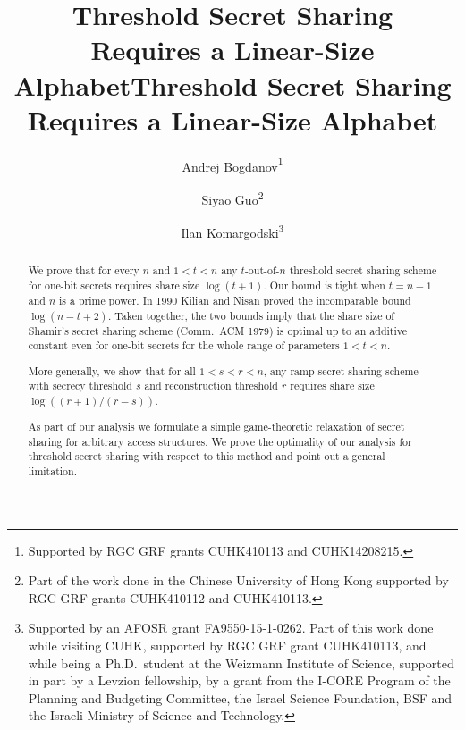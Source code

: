 \documentclass{toc}
\begin{document}
\begin{frontmatter}[classification=text]
  
%
\title{Threshold Secret Sharing \\ Requires a Linear-Size Alphabet}  %

%
%

\title{Threshold Secret Sharing \\ Requires a Linear-Size Alphabet}

%
%
%
%
%
%
%
%
%
%
%
%


%
%
%
%

%

\author[Bogdanov]{Andrej Bogdanov\thanks{Supported by RGC GRF grants  CUHK410113 and CUHK14208215.}}
\author[Guo]{Siyao Guo\thanks{Part of the work done in the Chinese University of Hong Kong supported by RGC GRF grants CUHK410112 and CUHK410113.}}
\author[Komargodski]{Ilan Komargodski\thanks{Supported by an AFOSR grant
FA9550-15-1-0262. Part of this work done while
    visiting CUHK, supported by RGC GRF grant CUHK410113, and while being a Ph.D.\
    student at the Weizmann Institute of Science, supported in part by a
    Levzion fellowship, by a grant from the I-CORE Program of the Planning and
    Budgeting Committee, the Israel Science Foundation, BSF and the Israeli
    Ministry of Science and Technology.}}

%
%
%
%

%
%
%
%
%
%
\begin{abstract}
  We prove that for every $n$ and $1 < t < n$ any $t$-out-of-$n$ threshold
  secret sharing scheme for one-bit secrets requires share size $\log(t + 1)$.
  Our bound is tight when $t = n - 1$ and $n$ is a prime power.  In 1990 Kilian
  and Nisan proved the incomparable bound $\log(n - t + 2)$.  Taken together,
  the two bounds imply that the share size of Shamir's secret sharing scheme
  (Comm.\ ACM 1979) is optimal up to an additive constant even for one-bit
  secrets for the whole range of parameters $1 < t < n$.
	
  More generally, we show that for all $1 < s < r < n$, any ramp secret sharing
  scheme with secrecy threshold $s$ and reconstruction threshold $r$ requires
  share size $\log((r + 1)/(r - s))$.
	
  As part of our analysis we formulate a simple game-theoretic relaxation of
  secret sharing for arbitrary access structures.  We prove the optimality of
  our analysis for threshold secret sharing with respect to this method and
  point out a general limitation.
\end{abstract}

%

\end{frontmatter}
\end{document}
